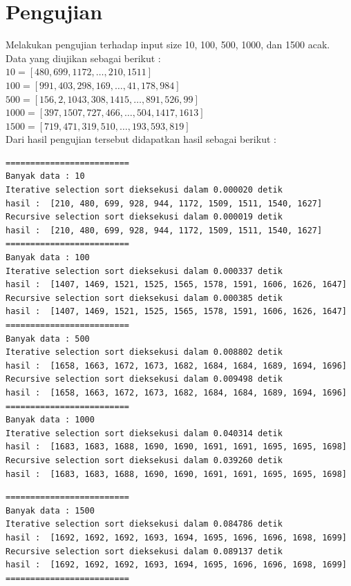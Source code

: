 \documentclass[12pt]{article}
\begin{document}
\section{Pengujian}
Melakukan pengujian terhadap input size 10, 100, 500, 1000, dan 1500 acak.\\
Data yang diujikan sebagai berikut :\\
$10 = [480, 699, 1172,\dotsc,210, 1511]$\\
$100 = [991, 403, 298, 169,\dotsc,41, 178, 984]$\\
$500 = [156, 2, 1043, 308, 1415,\dotsc, 891, 526, 99]$\\
$1000 = [397, 1507, 727, 466,\dotsc, 504, 1417, 1613]$\\
$1500 = [719, 471, 319, 510,\dotsc,  193, 593, 819]$\\
Dari hasil pengujian tersebut didapatkan hasil sebagai berikut :
\begin{verbatim}
=========================
Banyak data : 10
Iterative selection sort dieksekusi dalam 0.000020 detik
hasil :  [210, 480, 699, 928, 944, 1172, 1509, 1511, 1540, 1627]
Recursive selection sort dieksekusi dalam 0.000019 detik
hasil :  [210, 480, 699, 928, 944, 1172, 1509, 1511, 1540, 1627]
=========================
Banyak data : 100
Iterative selection sort dieksekusi dalam 0.000337 detik
hasil :  [1407, 1469, 1521, 1525, 1565, 1578, 1591, 1606, 1626, 1647]
Recursive selection sort dieksekusi dalam 0.000385 detik
hasil :  [1407, 1469, 1521, 1525, 1565, 1578, 1591, 1606, 1626, 1647]
=========================
Banyak data : 500
Iterative selection sort dieksekusi dalam 0.008802 detik
hasil :  [1658, 1663, 1672, 1673, 1682, 1684, 1684, 1689, 1694, 1696]
Recursive selection sort dieksekusi dalam 0.009498 detik
hasil :  [1658, 1663, 1672, 1673, 1682, 1684, 1684, 1689, 1694, 1696]
=========================
Banyak data : 1000
Iterative selection sort dieksekusi dalam 0.040314 detik
hasil :  [1683, 1683, 1688, 1690, 1690, 1691, 1691, 1695, 1695, 1698]
Recursive selection sort dieksekusi dalam 0.039260 detik
hasil :  [1683, 1683, 1688, 1690, 1690, 1691, 1691, 1695, 1695, 1698]
\end{verbatim}

\newpage

\begin{verbatim}
=========================
Banyak data : 1500
Iterative selection sort dieksekusi dalam 0.084786 detik
hasil :  [1692, 1692, 1692, 1693, 1694, 1695, 1696, 1696, 1698, 1699]
Recursive selection sort dieksekusi dalam 0.089137 detik
hasil :  [1692, 1692, 1692, 1693, 1694, 1695, 1696, 1696, 1698, 1699]
=========================
\end{verbatim}
\end{document}
